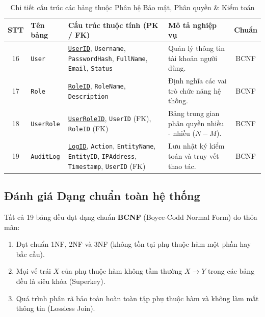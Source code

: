 \begin{table}[H]
\centering
\caption{Chi tiết cấu trúc các bảng thuộc Phân hệ Bảo mật, Phân quyền \& Kiểm toán}
\label{tab:ph_baomat}
\small
\begin{tabularx}{\textwidth}{|c|l|X|X|c|}
\hline
\textbf{STT} & \textbf{Tên bảng} & \textbf{Cấu trúc thuộc tính (PK / FK)} & \textbf{Mô tả nghiệp vụ} & \textbf{Chuẩn} \\ \hline
16 & \texttt{User} & \underline{\texttt{UserID}}, \texttt{Username}, \texttt{PasswordHash}, \texttt{FullName}, \texttt{Email}, \texttt{Status} & Quản lý thông tin tài khoản người dùng. & BCNF \\ \hline
17 & \texttt{Role} & \underline{\texttt{RoleID}}, \texttt{RoleName}, \texttt{Description} & Định nghĩa các vai trò chức năng hệ thống. & BCNF \\ \hline
18 & \texttt{UserRole} & \underline{\texttt{UserRoleID}}, \texttt{UserID} (FK), \texttt{RoleID} (FK) & Bảng trung gian phân quyền nhiều - nhiều ($N-M$). & BCNF \\ \hline
19 & \texttt{AuditLog} & \underline{\texttt{LogID}}, \texttt{Action}, \texttt{EntityName}, \texttt{EntityID}, \texttt{IPAddress}, \texttt{Timestamp}, \texttt{UserID} (FK) & Lưu nhật ký kiểm toán và truy vết thao tác. & BCNF \\ \hline
\end{tabularx}
\end{table}

\subsection{Đánh giá Dạng chuẩn toàn hệ thống}
Tất cả 19 bảng đều đạt dạng chuẩn \textbf{BCNF} (Boyce-Codd Normal Form) do thỏa mãn:
\begin{enumerate}
    \item Đạt chuẩn 1NF, 2NF và 3NF (không tồn tại phụ thuộc hàm một phần hay bắc cầu).
    \item Mọi vế trái $X$ của phụ thuộc hàm không tầm thường $X \rightarrow Y$ trong các bảng đều là siêu khóa (Superkey).
    \item Quá trình phân rã bảo toàn hoàn toàn tập phụ thuộc hàm và không làm mất thông tin (Lossless Join).
\end{enumerate}
